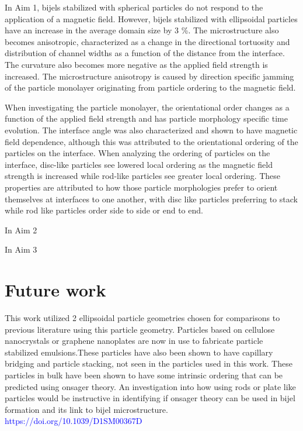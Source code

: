 In Aim 1, bijels stabilized with spherical particles do not respond to the application of a magnetic field. However, bijels stabilized
with ellipsoidal particles have an increase in the average domain size by 3 \%. The microstructure also becomes anisotropic, 
characterized as a change in the directional tortuosity and distribution of channel widths as a function of the distance from the 
interface. The curvature also becomes more negative as the applied field strength is increased. The microstructure anisotropy is caused
by direction specific jamming of the particle monolayer originating from particle ordering to the magnetic field.

When investigating the particle monolayer, the orientational order changes as a function of the applied field strength and has particle
morphology specific time evolution. The interface angle was also characterized and shown to have magnetic field dependence, although
this was attributed to the orientational ordering of the particles on the interface. When analyzing the ordering of particles on the
interface, disc-like particles see lowered local ordering as the magnetic field strength is increased while rod-like particles see
greater local ordering. These properties are attributed to how those particle morphologies prefer to orient themselves at interfaces
to one another, with disc like particles preferring to stack while rod like particles order side to side or end to end.

In Aim 2

In Aim 3

\section{Future work}

This work utilized 2 ellipsoidal particle geometries chosen for comparisons to previous literature using this 
particle geometry. Particles based on cellulose nanocrystals or graphene nanoplates are now in use to fabricate
particle stabilized emulsions.These particles have also been shown to have capillary bridging and particle stacking,
not seen in the particles used in this work. These particles in bulk have been shown to have some intrinsic ordering
that can be predicted using onsager theory. An investigation into how using rods or plate like particles would be 
instructive in identifying if onsager theory can be used in bijel formation and its link to bijel microstructure. 
\textcolor{blue}{https://doi.org/10.1039/D1SM00367D}

